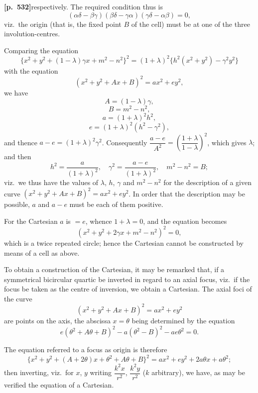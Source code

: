 \documentclass[11pt,a4paper]{article}
\begin{document}
\bigskip

\noindent\textbf{[p.~532]}\quad respectively. The required condition thus is
\[
(\alpha\delta - \beta\gamma)(\beta\delta - \gamma\alpha)(\gamma\delta - \alpha\beta) = 0,
\]
viz.\ the origin (that is, the fixed point $B$ of the cell) must be at one of the three involution-centres.

Comparing the equation
\[
\{x^{2} + y^{2} + (1 - \lambda)\gamma x + m^{2} - n^{2}\}^{2} = (1 + \lambda)^{2}\{h^{2}(x^{2} + y^{2}) - \gamma^{2} y^{2}\}
\]
with the equation
\[
(x^{2} + y^{2} + Ax + B)^{2} = a x^{2} + e y^{2},
\]
we have
\[
A = (1 - \lambda)\gamma,
\]
\[
B = m^{2} - n^{2},
\]
\[
a = (1 + \lambda)^{2} h^{2},
\]
\[
e = (1 + \lambda)^{2}(h^{2} - \gamma^{2}),
\]
and thence $a - e = (1 + \lambda)^{2}\gamma^{2}$. Consequently $\dfrac{a - e}{A^{2}} = \left( \dfrac{1 + \lambda}{1 - \lambda} \right)^{2}$, which gives $\lambda$; and then
\[
h^{2} = \frac{a}{(1 + \lambda)^{2}},\quad \gamma^{2} = \frac{a - e}{(1 + \lambda)^{2}},\quad m^{2} - n^{2} = B;
\]
viz.\ we thus have the values of $\lambda$, $h$, $\gamma$ and $m^{2} - n^{2}$ for the description of a given curve $(x^{2} + y^{2} + Ax + B)^{2} = a x^{2} + e y^{2}$. In order that the description may be possible, $a$ and $a - e$ must be each of them positive.

For the Cartesian $a$ is $= e$, whence $1 + \lambda = 0$, and the equation becomes
\[
(x^{2} + y^{2} + 2\gamma x + m^{2} - n^{2})^{2} = 0,
\]
which is a twice repeated circle; hence the Cartesian cannot be constructed by means of a cell as above.

To obtain a construction of the Cartesian, it may be remarked that, if a symmetrical bicircular quartic be inverted in regard to an axial focus, viz.\ if the focus be taken as the centre of inversion, we obtain a Cartesian. The axial foci of the curve
\[
(x^{2} + y^{2} + Ax + B)^{2} = a x^{2} + e y^{2}
\]
are points on the axis, the abscissa $x = \theta$ being determined by the equation
\[
e(\theta^{2} + A\theta + B)^{2} - a(\theta^{2} - B)^{2} - a e \theta^{2} = 0.
\]

The equation referred to a focus as origin is therefore
\[
\{x^{2} + y^{2} + (A + 2\theta) x + \theta^{2} + A\theta + B\}^{2} = a x^{2} + e y^{2} + 2 a \theta x + a \theta^{2};
\]
then inverting, viz.\ for $x$, $y$ writing $\dfrac{k^{2} x}{r^{2}}$, $\dfrac{k^{2} y}{r^{2}}$ ($k$ arbitrary), we have, as may be verified the equation of a Cartesian.

\bigskip
\end{document}
